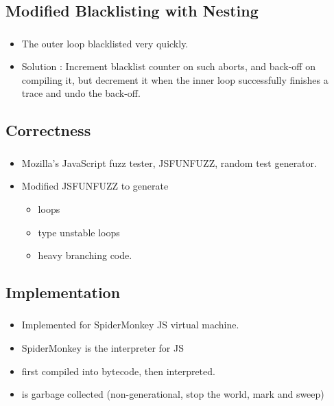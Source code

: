 \documentclass[mathserif,10pt]{beamer}
\newcommand{\cmt}[1]{}
\begin{document}
\subsection{Modified Blacklisting with Nesting}
\frame
{
  \frametitle{\subsecname}
  \begin{itemize}
   \item  The outer loop blacklisted very quickly.
   \item Solution : 
     Increment blacklist counter on such aborts, and back-off on compiling it,  but decrement it when the inner loop successfully finishes a trace and undo the back-off.
   \end{itemize}
}
               \cmt{ as the inner loop not available or takes side exit
   Solution : 
     Increment blacklist counter on such aborts, and back-off on compiling it,  but decrement it when the inner loop
     successfully finishes a trace and undo the back-off.
               }

\subsection{Correctness}
\frame
{
  \frametitle{\subsecname}
  \begin{itemize}
    \item Mozilla’s JavaScript fuzz tester, JSFUNFUZZ, random test generator.
    \item Modified JSFUNFUZZ to generate
    \begin{itemize}
      \item loops
      \item type unstable loops
      \item heavy branching code.
    \end{itemize}
  \end{itemize}
}
\subsection{Implementation}
\frame
{
  \frametitle{\subsecname}
  \begin{itemize}
    \item Implemented for SpiderMonkey JS virtual machine.
    \item SpiderMonkey is the interpreter for JS
    \item first compiled into bytecode, then interpreted.
    \item is garbage collected (non-generational, stop the world, mark and sweep)
  \end{itemize}  
}
\end{document}
